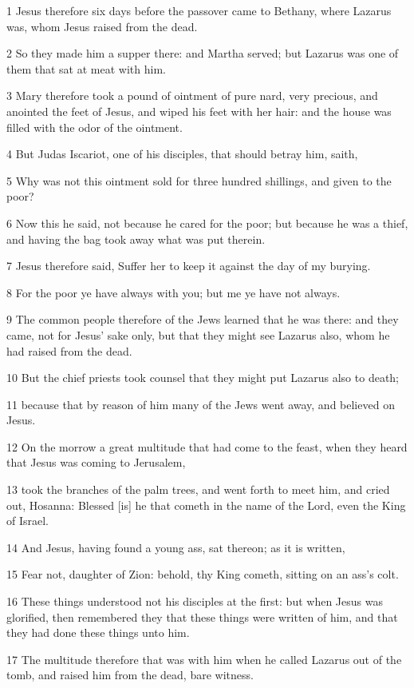 \par 1 Jesus therefore six days before the passover came to Bethany, where Lazarus was, whom Jesus raised from the dead.
\par 2 So they made him a supper there: and Martha served; but Lazarus was one of them that sat at meat with him.
\par 3 Mary therefore took a pound of ointment of pure nard, very precious, and anointed the feet of Jesus, and wiped his feet with her hair: and the house was filled with the odor of the ointment.
\par 4 But Judas Iscariot, one of his disciples, that should betray him, saith,
\par 5 Why was not this ointment sold for three hundred shillings, and given to the poor?
\par 6 Now this he said, not because he cared for the poor; but because he was a thief, and having the bag took away what was put therein.
\par 7 Jesus therefore said, Suffer her to keep it against the day of my burying.
\par 8 For the poor ye have always with you; but me ye have not always.
\par 9 The common people therefore of the Jews learned that he was there: and they came, not for Jesus' sake only, but that they might see Lazarus also, whom he had raised from the dead.
\par 10 But the chief priests took counsel that they might put Lazarus also to death;
\par 11 because that by reason of him many of the Jews went away, and believed on Jesus.
\par 12 On the morrow a great multitude that had come to the feast, when they heard that Jesus was coming to Jerusalem,
\par 13 took the branches of the palm trees, and went forth to meet him, and cried out, Hosanna: Blessed [is] he that cometh in the name of the Lord, even the King of Israel.
\par 14 And Jesus, having found a young ass, sat thereon; as it is written,
\par 15 Fear not, daughter of Zion: behold, thy King cometh, sitting on an ass's colt.
\par 16 These things understood not his disciples at the first: but when Jesus was glorified, then remembered they that these things were written of him, and that they had done these things unto him.
\par 17 The multitude therefore that was with him when he called Lazarus out of the tomb, and raised him from the dead, bare witness.
